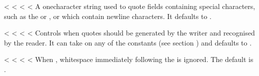 \documentclass[letterpaper,10pt,english]{sphinxmanual}
\begin{document}

\vspace{5px}

\begin{fulllineitems}
\label{\detokenize{csv:csv.Dialect.quotechar}}<%
\pysigstartsignatures
<%
<%
<%
A one\sphinxhyphen{}character string used to quote fields containing special characters, such
as the  or , or which contain new\sphinxhyphen{}line characters.  It
defaults to .

\end{fulllineitems}


\vspace{5px}

\begin{fulllineitems}
\label{\detokenize{csv:csv.Dialect.quoting}}<%
\pysigstartsignatures
<%
<%
<%
Controls when quotes should be generated by the writer and recognised by the
reader.  It can take on any of the  constants (see section
{\hyperref[\detokenize{csv:csv-contents}]{}}) and defaults to {\hyperref[\detokenize{csv:csv.QUOTE_MINIMAL}]{}}.

\end{fulllineitems}


\vspace{5px}

\begin{fulllineitems}
\label{\detokenize{csv:csv.Dialect.skipinitialspace}}<%
\pysigstartsignatures
<%
<%
<%
When , whitespace immediately following the  is ignored.
The default is .

\end{fulllineitems}
\end{document}
